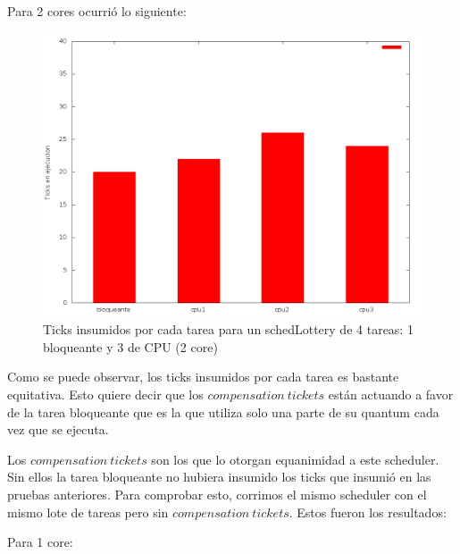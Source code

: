 Para 2 cores ocurrió lo siguiente:

\begin{figure}[!h]
	\begin{center}
		  \includegraphics[scale=0.3]{Graficos/comp2.png}
		  \caption{Ticks insumidos por cada tarea para un schedLottery de 4 tareas: 1 bloqueante y 3 de CPU (2 core) }
		  \label{fig:contra1}
	\end{center}
\end{figure}
\FloatBarrier

Como se puede observar, los ticks insumidos por cada tarea es bastante equitativa. Esto quiere decir que los $compensation \ tickets$ están actuando a favor de la tarea bloqueante que es la que utiliza solo una parte de su quantum cada vez que se ejecuta.

Los $compensation \ tickets$ son los que lo otorgan equanimidad a este scheduler. Sin ellos la tarea bloqueante no hubiera insumido los ticks que insumió en las pruebas anteriores. Para comprobar esto, corrimos el mismo scheduler con el mismo lote de tareas pero sin $compensation \ tickets$. Estos fueron los resultados:

Para 1 core:

